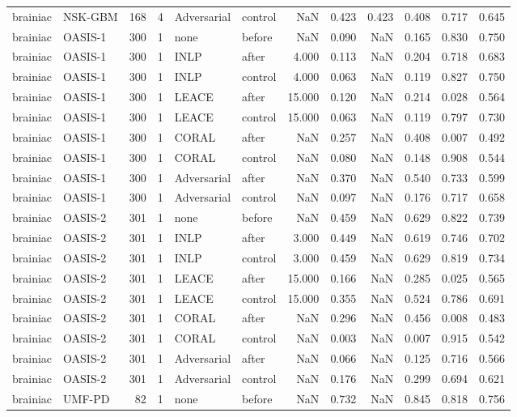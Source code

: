 \begin{tabular}{llrrllrrrrrr}
brainiac & NSK-GBM & 168 & 4 & Adversarial & control & NaN & 0.423 & 0.423 & 0.408 & 0.717 & 0.645 \\
brainiac & OASIS-1 & 300 & 1 & none & before & NaN & 0.090 & NaN & 0.165 & 0.830 & 0.750 \\
brainiac & OASIS-1 & 300 & 1 & INLP & after & 4.000 & 0.113 & NaN & 0.204 & 0.718 & 0.683 \\
brainiac & OASIS-1 & 300 & 1 & INLP & control & 4.000 & 0.063 & NaN & 0.119 & 0.827 & 0.750 \\
brainiac & OASIS-1 & 300 & 1 & LEACE & after & 15.000 & 0.120 & NaN & 0.214 & 0.028 & 0.564 \\
brainiac & OASIS-1 & 300 & 1 & LEACE & control & 15.000 & 0.063 & NaN & 0.119 & 0.797 & 0.730 \\
brainiac & OASIS-1 & 300 & 1 & CORAL & after & NaN & 0.257 & NaN & 0.408 & 0.007 & 0.492 \\
brainiac & OASIS-1 & 300 & 1 & CORAL & control & NaN & 0.080 & NaN & 0.148 & 0.908 & 0.544 \\
brainiac & OASIS-1 & 300 & 1 & Adversarial & after & NaN & 0.370 & NaN & 0.540 & 0.733 & 0.599 \\
brainiac & OASIS-1 & 300 & 1 & Adversarial & control & NaN & 0.097 & NaN & 0.176 & 0.717 & 0.658 \\
brainiac & OASIS-2 & 301 & 1 & none & before & NaN & 0.459 & NaN & 0.629 & 0.822 & 0.739 \\
brainiac & OASIS-2 & 301 & 1 & INLP & after & 3.000 & 0.449 & NaN & 0.619 & 0.746 & 0.702 \\
brainiac & OASIS-2 & 301 & 1 & INLP & control & 3.000 & 0.459 & NaN & 0.629 & 0.819 & 0.734 \\
brainiac & OASIS-2 & 301 & 1 & LEACE & after & 15.000 & 0.166 & NaN & 0.285 & 0.025 & 0.565 \\
brainiac & OASIS-2 & 301 & 1 & LEACE & control & 15.000 & 0.355 & NaN & 0.524 & 0.786 & 0.691 \\
brainiac & OASIS-2 & 301 & 1 & CORAL & after & NaN & 0.296 & NaN & 0.456 & 0.008 & 0.483 \\
brainiac & OASIS-2 & 301 & 1 & CORAL & control & NaN & 0.003 & NaN & 0.007 & 0.915 & 0.542 \\
brainiac & OASIS-2 & 301 & 1 & Adversarial & after & NaN & 0.066 & NaN & 0.125 & 0.716 & 0.566 \\
brainiac & OASIS-2 & 301 & 1 & Adversarial & control & NaN & 0.176 & NaN & 0.299 & 0.694 & 0.621 \\
brainiac & UMF-PD & 82 & 1 & none & before & NaN & 0.732 & NaN & 0.845 & 0.818 & 0.756 \\

\end{tabular}
